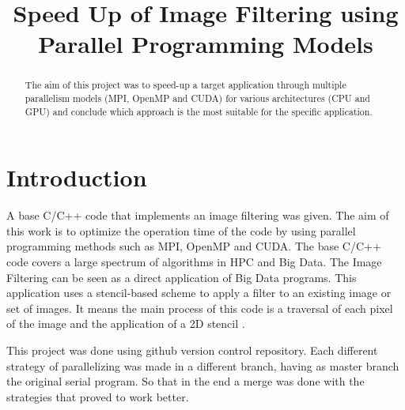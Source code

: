 \documentclass[conference,compsoc]{IEEEtran}
\begin{document}
\title{Speed Up of Image Filtering using Parallel Programming Models}
\author{
\and
{}
}

\maketitle

\begin{abstract}
The aim of this project was to speed-up a target application through multiple parallelism models (MPI, OpenMP and CUDA) for various architectures (CPU and GPU) and conclude which approach is the most suitable for the specific application. 
\end{abstract}
\IEEEpeerreviewmaketitle

\section{Introduction}
A base C/C++ code that implements an image filtering was given. The aim of this work is to optimize the operation time of the code by using parallel programming methods such as MPI, OpenMP and CUDA.
The base C/C++ code covers a large spectrum of algorithms in HPC and Big Data. The Image Filtering can be seen as a direct application of Big Data programs. This application uses a stencil-based scheme to apply a filter to an existing image or set of images. It means the main process of this code is a traversal of each pixel of the image and the application of a 2D stencil \cite{CoursePage}.

This project was done using github version control repository. Each different strategy of parallelizing was made in a different branch, having as master branch the original serial program. So that in the end a merge was done with the strategies that proved to work better.
\end{document}
